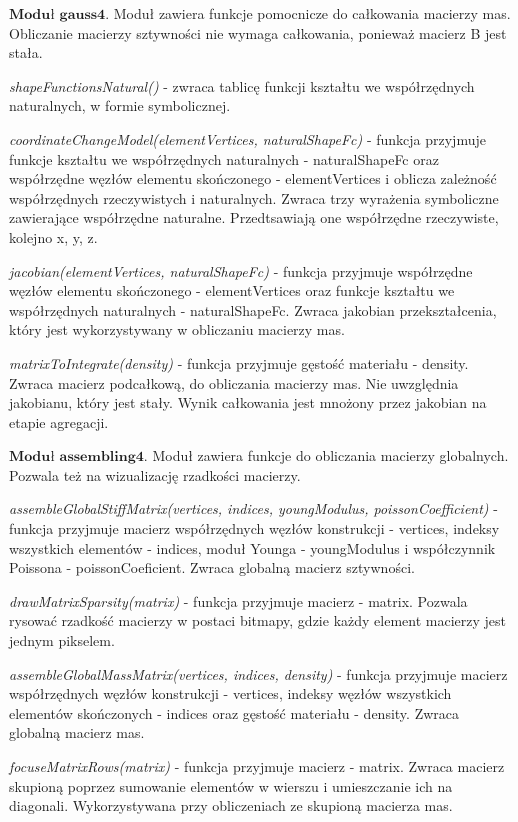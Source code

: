 \vspace {3mm}
 \( \textbf{Moduł gauss4} \).
Moduł zawiera funkcje pomocnicze do całkowania macierzy mas. Obliczanie macierzy sztywności nie wymaga całkowania, ponieważ macierz B jest stała.

\vspace {3mm}
\textit{shapeFunctionsNatural()} - zwraca tablicę funkcji kształtu we współrzędnych naturalnych, w formie symbolicznej.

\vspace {3mm}
\textit{coordinateChangeModel(elementVertices, naturalShapeFc)} - funkcja przyjmuje funkcje kształtu we współrzędnych naturalnych - naturalShapeFc  oraz współrzędne węzłów elementu skończonego - elementVertices i oblicza zależność współrzędnych rzeczywistych i naturalnych. Zwraca trzy wyrażenia symboliczne zawierające współrzędne naturalne. Przedtsawiają one współrzędne rzeczywiste, kolejno x, y, z.

\vspace {3mm}
\textit{jacobian(elementVertices, naturalShapeFc)} - funkcja przyjmuje współrzędne węzłów elementu skończonego - elementVertices oraz funkcje kształtu we współrzędnych naturalnych - naturalShapeFc. Zwraca jakobian przekształcenia, który jest wykorzystywany w obliczaniu macierzy mas.

\vspace {3mm}
\textit{matrixToIntegrate(density)} - funkcja przyjmuje gęstość materiału - density. Zwraca macierz podcałkową, do obliczania macierzy mas. Nie uwzględnia jakobianu, który jest stały. Wynik całkowania jest mnożony przez jakobian na etapie agregacji.

\vspace {3mm}
 \( \textbf{Moduł assembling4} \).
Moduł zawiera funkcje do obliczania macierzy globalnych. Pozwala też na wizualizację rzadkości macierzy.

\vspace {3mm}
\textit{assembleGlobalStiffMatrix(vertices, indices, youngModulus, poissonCoefficient)} - funkcja przyjmuje macierz współrzędnych węzłów konstrukcji - vertices, indeksy wszystkich elementów - indices, moduł Younga - youngModulus i współczynnik Poissona - poissonCoeficient. Zwraca globalną macierz sztywności.

\vspace {3mm}
\textit{drawMatrixSparsity(matrix)} - funkcja przyjmuje macierz - matrix. Pozwala rysować rzadkość macierzy w postaci bitmapy, gdzie każdy element macierzy jest jednym pikselem.

\vspace {3mm}
\textit{assembleGlobalMassMatrix(vertices, indices, density)} - funkcja przyjmuje macierz współrzędnych węzłów konstrukcji - vertices, indeksy węzłów wszystkich elementów skończonych - indices oraz gęstość materiału - density. Zwraca globalną macierz mas.

\vspace {3mm}
\textit{focuseMatrixRows(matrix)} - funkcja przyjmuje macierz - matrix. Zwraca macierz skupioną poprzez sumowanie elementów w wierszu i umieszczanie ich na diagonali. Wykorzystywana przy obliczeniach ze skupioną macierza mas.
